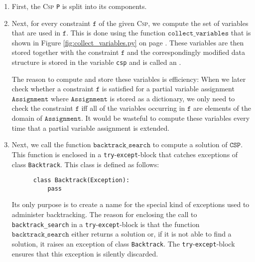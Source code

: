 \begin{enumerate}
\item First, the \textsc{Csp} \texttt{P} is split into its components.
\item Next, for every constraint $\texttt{f}$ of the given \textsc{Csp}, we compute the set of variables that
      are used in $\texttt{f}$.  This is done using the function $\texttt{collect\_variables}$ that is shown in
      Figure \ref{fig:collect_variables.py} on page \pageref{fig:collect_variables.py}.
      These variables are then stored together with the constraint $\texttt{f}$ and
      the correspondingly modified data structure is stored in the variable \texttt{csp} and is called an
      .

      The reason to compute and store these variables is efficiency: When we later check whether a constraint $\texttt{f}$
      is satisfied for a partial variable assignment $\texttt{Assignment}$ where $\texttt{Assignment}$ is
      stored as a dictionary, we only need to check the constraint $\texttt{f}$ iff all of the variables occurring
      in $\texttt{f}$ are elements of the domain of $\texttt{Assignment}$.   It would be wasteful to compute
      these variables every time that a partial variable assignment is extended.
\item Next, we call the function $\texttt{backtrack\_search}$ to compute a solution of $\texttt{CSP}$.
      This function is enclosed in a \texttt{try}-\texttt{except}-block that catches exceptions of class
      \texttt{Backtrack}.  This class is defined as follows:
      
\begin{verbatim}
      class Backtrack(Exception):
          pass
\end{verbatim}
      Its only purpose is to create a name for the special kind of exceptions used to administer backtracking.
      The reason for enclosing the call to \texttt{backtrack\_search} in a \texttt{try}-\texttt{except}-block
      is that the function $\texttt{backtrack\_search}$ either returns a solution or, if it is not
      able to find a solution, it raises an exception of class \texttt{Backtrack}.
      The \texttt{try}-\texttt{except}-block ensures that this exception is silently discarded.
\end{enumerate}

